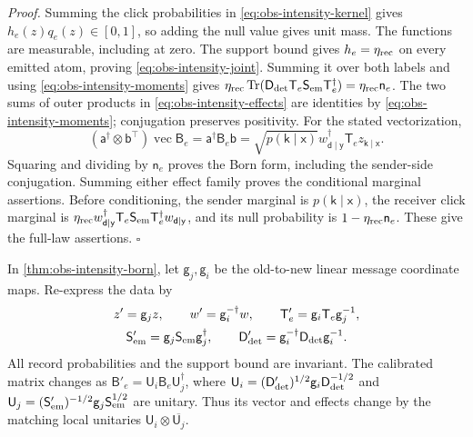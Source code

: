\noindent\emph{Proof.}
Summing the click probabilities in \eqref{eq:obs-intensity-kernel} gives
$h_e(z)q_e(z)\in[0,1]$, so adding the null value gives unit mass.
The functions are measurable, including at zero. The support bound gives
$h_e=\eta_{\rm rec}$ on every emitted atom, proving
\eqref{eq:obs-intensity-joint}. Summing it over both labels and using
\eqref{eq:obs-intensity-moments} gives
$\eta_{\rm rec}\operatorname{Tr}(\mathsf D_{\rm det}\mathsf T_e\mathsf S_{\rm em}
\mathsf T_e^{\dagger})=\eta_{\rm rec}\mathsf n_e$.
The two sums of outer products in \eqref{eq:obs-intensity-effects} are
identities by \eqref{eq:obs-intensity-moments}; conjugation preserves
positivity. For the stated vectorization,
\[
(\mathsf a^{\dagger}\otimes\mathsf b^{\top})\operatorname{vec}\mathsf B_e
=\mathsf a^{\dagger}\mathsf B_e\mathsf b
=\sqrt{p(\mathsf k\mid\mathsf x)}
w_{\mathsf d\mid\mathsf y}^{\dagger}\mathsf T_ez_{\mathsf k\mid\mathsf x}.
\]
Squaring and dividing by $\mathsf n_e$ proves the Born form, including the
sender-side conjugation. Summing either effect family proves the conditional
marginal assertions. Before conditioning, the sender marginal is
$p(\mathsf k\mid\mathsf x)$, the receiver click marginal is
$\eta_{\rm rec}w_{\mathsf d\mid\mathsf y}^{\dagger}\mathsf T_e
\mathsf S_{\rm em}\mathsf T_e^{\dagger}w_{\mathsf d\mid\mathsf y}$,
and its null probability is $1-\eta_{\rm rec}\mathsf n_e$.
These give the full-law assertions. $\square$

In \cref{thm:obs-intensity-born}, let $\mathsf g_j,\mathsf g_i$ be the
old-to-new linear message coordinate maps. Re-express the data by
\begin{equation}
\begin{gathered}
z'=\mathsf g_jz,\qquad w'=\mathsf g_i^{-\dagger}w,\qquad
\mathsf T'_e=\mathsf g_i\mathsf T_e\mathsf g_j^{-1},\\
\mathsf S'_{\rm em}=\mathsf g_j\mathsf S_{\rm em}\mathsf g_j^{\dagger},
\qquad
\mathsf D'_{\rm det}=\mathsf g_i^{-\dagger}\mathsf D_{\rm det}\mathsf g_i^{-1}.
\end{gathered}
\label{eq:obs-intensity-gauge}
\end{equation}
All record probabilities and the support bound are invariant. The calibrated
matrix changes as $\mathsf B'_e=\mathsf U_i\mathsf B_e\mathsf U_j^{\dagger}$,
where $\mathsf U_i=(\mathsf D'_{\rm det})^{1/2}\mathsf g_i
\mathsf D_{\rm det}^{-1/2}$ and
$\mathsf U_j=(\mathsf S'_{\rm em})^{-1/2}\mathsf g_j\mathsf S_{\rm em}^{1/2}$
are unitary. Thus its vector and effects change by the matching local
unitaries $\mathsf U_i\otimes\overline{\mathsf U_j}$.


